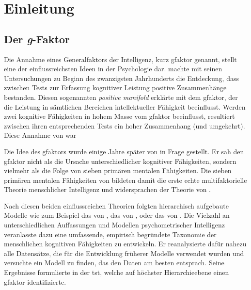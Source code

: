 \documentclass[11pt, twoside, a4paper]{book}		%
\begin{document}
\mainmatter				%


\chapter{Einleitung \label{cha:Einleitung}}


\section{Der \textit{g}-Faktor}

Die Annahme eines Generalfaktors der Intelligenz, kurz \gls{gfaktor} genannt, stellt eine der einflussreichsten Ideen in der Psychologie dar. \citet{Spearman1904, Spearman1927} machte mit seinen Untersuchungen zu Beginn des zwanzigsten Jahrhunderts die Entdeckung, dass zwischen Tests zur Erfassung kognitiver Leistung positive Zusammenhänge bestanden. Diesen sogenannten \textit{positive manifold} erklärte \citeauthor{Spearman1927} mit dem \gls{gfaktor}, der die Leistung in sämtlichen Bereichen intellektueller Fähigkeit beeinflusst. Werden zwei kognitive Fähigkeiten in hohem Masse vom \gls{gfaktor} beeinflusst, resultiert zwischen ihren entsprechenden Tests ein hoher Zusammenhang (und umgekehrt). Diese Annahme von \citet{Spearman1927} war 


Die Idee des \gls{gfaktor}s wurde einige Jahre später von \citet{Thurstone1938} in Frage gestellt. Er sah den \gls{gfaktor} nicht als die Ursache unterschiedlicher kognitiver Fähigkeiten, sondern vielmehr als die Folge von sieben primären mentalen Fähigkeiten. Die sieben primären mentalen Fähigkeiten von \citeauthor{Thurstone1938} bildeten damit die erste echte multifaktorielle Theorie menschlicher Intelligenz und widersprachen der Theorie von \citeauthor{Spearman1904}. 



Nach diesen beiden einflussreichen Theorien folgten hierarchisch aufgebaute Modelle wie zum Beispiel das von \citet{Vernon1950}, das von \citet{Cattell1971},  oder das von \citet{Jaeger1984}. Die Vielzahl an unterschiedlichen Auffassungen und Modellen psychometrischer Intelligenz veranlasste \citet{Carroll1993} dazu eine umfassende, empirisch begründete Taxonomie der menschlichen kognitiven Fähigkeiten zu entwickeln. Er reanalysierte dafür nahezu alle Datensätze, die für die Entwicklung früherer Modelle verwendet wurden und versuchte ein Modell zu finden, das den Daten am besten entsprach. Seine Ergebnisse formulierte \citeauthor{Carroll1993} in der \gls{tst}, welche auf höchster Hierarchieebene einen \gls{gfaktor} identifizierte. 
\end{document}
